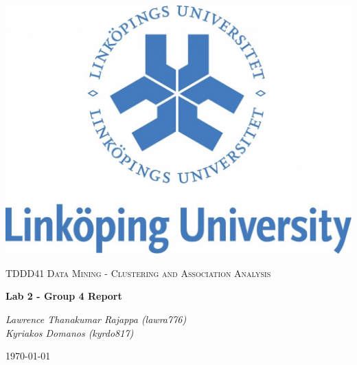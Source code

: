 \documentclass[a4paper,10pt]{article}
\begin{document}
\begin{titlepage}
	\centering
	\includegraphics[width=.6\textwidth]{liu-logo.png}\par
	\vfill
	{\scshape\Large TDDD41 Data Mining - Clustering and Association Analysis\par}
	{\huge\bfseries Lab 2 -  Group 4 Report\par}
	\vspace{0.5cm}
    {\large\itshape Lawrence Thanakumar Rajappa (lawra776)\\
     \large\itshape Kyriakos Domanos (kyrdo817)\par}
	\vfill
	{\large \today\par}
\end{titlepage}
\end{document}
